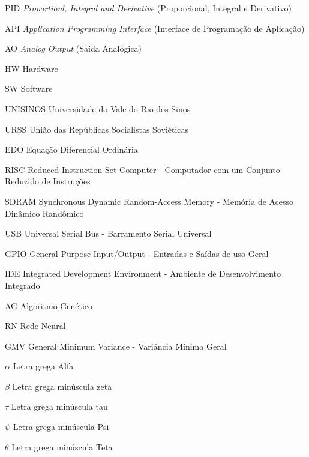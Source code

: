 \listoffigures*
\cleardoublepage
\listoftables*
\cleardoublepage
\begin{siglas}
\item[PID] \textit{Proportionl, Integral and Derivative} (Proporcional, Integral e Derivativo)
\item[API] \textit{Application Programming Interface} (Interface de Programação de Aplicação)
\item[AO] \textit{Analog Output} (Saída Analógica)
\item[HW] Hardware
\item[SW] Software
\item[UNISINOS] Universidade do Vale do Rio dos Sinos
\item[URSS] União das Repúblicas Socialistas Soviéticas
\item[EDO] Equação Diferencial Ordinária
\item[RISC] Reduced Instruction Set Computer - Computador com um Conjunto Reduzido de Instruções
\item[SDRAM] Synchronous Dynamic Random-Access Memory - Memória de Acesso Dinâmico Randômico
\item[USB]  Universal Serial Bus - Barramento Serial Universal
\item[GPIO] General Purpose Input/Output - Entradas e Saídas de uso Geral
\item[IDE] Integrated Development Environment - Ambiente de Desenvolvimento Integrado
\item[AG] Algoritmo Genético
\item[RN] Rede Neural
\item[GMV] General Minimum Variance - Variância Mínima Geral

\end{siglas}
\begin{simbolos}
  \item[$ \alpha $] Letra grega Alfa
  \item[$ \beta $] Letra grega minúscula zeta
  \item[$ \tau $] Letra grega minúscula tau
  \item[$ \psi $] Letra grega minúscula Psi
  \item[$ \theta $] Letra grega minúscula Teta
\end{simbolos}